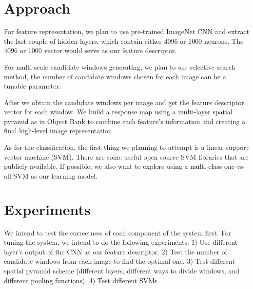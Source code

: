 \documentclass[letterpaper,twocolumn,10pt]{article}
\begin{document}
\section{Approach}
\par
    For feature representation, we plan to use pre-trained ImageNet CNN and
    extract the last couple of hidden-layers, which contain either 4096 or
    1000 neurons. The 4096 or 1000 vector would serve as our feature
    descriptor.

\par
    For multi-scale candidate windows generating, we plan to use selective
    search method, the number of candidate windows chosen for each image can be
    a tunable parameter.

\par
    After we obtain the candidate windows per image and get the feature
    descriptor vector for each window. We build a response map using
    a multi-layer spatial pyramid as in Object Bank to combine each feature's
    information and creating a final high-level image representation.

\par
    As for the classification, the first thing we planning to attempt is
    a linear support vector machine (SVM). There are some useful open source
    SVM libraries that are publicly available.  If possible, we also want to
    explore using a multi-class one-vs-all SVM as our learning model.

\section{Experiments}
We intend to test the correctness of each component of the system first.
For tuning the system, we intend to do the following experiments:
1) Use different layer's output of the CNN as our feature descriptor.
2) Test the number of candidate windows from each image to find the optimal one.
3) Test different spatial pyramid scheme (different layers, different ways to
divide windows, and different pooling functions).
4) Test different SVMs.
\end{document}

